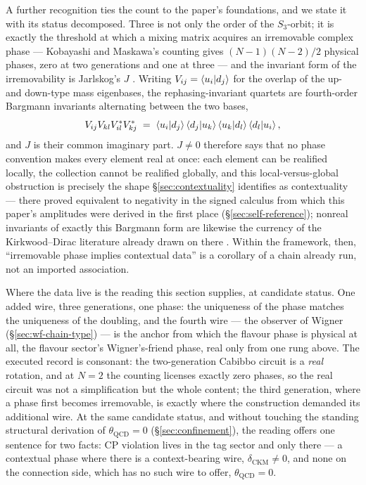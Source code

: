 A further recognition ties the count to the paper's foundations, and we state it with its
status decomposed. Three is not only the order of the $S_3$-orbit; it is exactly the threshold
at which a mixing matrix acquires an irremovable complex phase --- Kobayashi and Maskawa's
counting gives $(N-1)(N-2)/2$ physical phases, zero at two generations and one at three
\autocite{kobayashimaskawa1973} --- and the invariant form of the irremovability is Jarlskog's
$J$ \autocite{jarlskog1985}. Writing $V_{ij} = \braket{u_i|d_j}$ for the overlap of the up- and
down-type mass eigenbases, the rephasing-invariant quartets are fourth-order Bargmann invariants
alternating between the two bases,
\begin{equation}
  V_{ij}V_{kl}V^{*}_{il}V^{*}_{kj}
  \;=\; \braket{u_i|d_j}\braket{d_j|u_k}\braket{u_k|d_l}\braket{d_l|u_i},
  \label{eq:jarlskog-bargmann}
\end{equation}
and $J$ is their common imaginary part. $J \neq 0$ therefore says that no phase convention makes
every element real at once: each element can be realified locally, the collection cannot be
realified globally, and this local-versus-global obstruction is precisely the shape
\S\ref{sec:contextuality} identifies as contextuality --- there proved equivalent to negativity
\autocite{spekkens2008negativity} in the signed calculus from which this paper's amplitudes were
derived in the first place (\S\ref{sec:self-reference}); nonreal invariants of exactly this
Bargmann form are likewise the currency of the Kirkwood--Dirac literature already drawn on there
\autocite{arvidssonshukur2024kirkwood}. Within the framework, then, ``irremovable phase implies
contextual data'' is a corollary of a chain already run, not an imported association.

Where the data live is the reading this section supplies, at candidate status. One added wire,
three generations, one phase: the uniqueness of the phase matches the uniqueness of the
doubling, and the fourth wire --- the observer of Wigner (\S\ref{sec:wf-chain-type}) --- is the
anchor from which the flavour phase is physical at all, the flavour sector's Wigner's-friend
phase, real only from one rung above. The executed record is consonant: the two-generation
Cabibbo circuit is a \emph{real} rotation, and at $N = 2$ the counting licenses exactly zero
phases, so the real circuit was not a simplification but the whole content; the third
generation, where a phase first becomes irremovable, is exactly where the construction demanded
its additional wire. At the same candidate status, and without touching the standing structural
derivation of $\theta_{\mathrm{QCD}} = 0$ (\S\ref{sec:confinement}), the reading offers one
sentence for two facts: CP violation lives in the tag sector and only there --- a contextual
phase where there is a context-bearing wire, $\delta_{\mathrm{CKM}} \neq 0$, and none on the
connection side, which has no such wire to offer, $\theta_{\mathrm{QCD}} = 0$.

